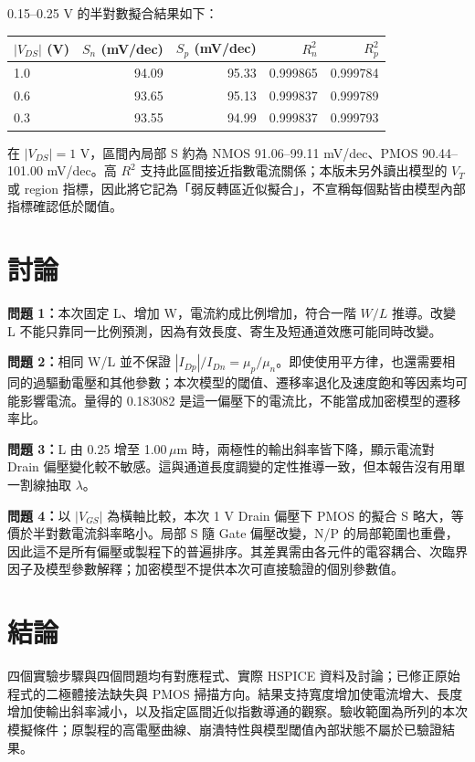 0.15--0.25 V 的半對數擬合結果如下：
\begin{center}
\setlength{\tabcolsep}{3pt}
\begin{tabular}{lrrrr}
\toprule
$|V_{DS}|$ (V) & $S_n$ (mV/dec) & $S_p$ (mV/dec) & $R_n^2$ & $R_p^2$ \\
\midrule
1.0 & 94.09 & 95.33 & 0.999865 & 0.999784 \\
0.6 & 93.65 & 95.13 & 0.999837 & 0.999789 \\
0.3 & 93.55 & 94.99 & 0.999837 & 0.999793 \\
\bottomrule
\end{tabular}
\end{center}

在 $|V_{DS}|=1$ V，區間內局部 S 約為 NMOS 91.06--99.11 mV/dec、PMOS 90.44--101.00 mV/dec。高 $R^2$ 支持此區間接近指數電流關係；本版未另外讀出模型的 $V_T$ 或 region 指標，因此將它記為「弱反轉區近似擬合」，不宣稱每個點皆由模型內部指標確認低於閾值。

\section{討論}
\textbf{問題 1：}本次固定 L、增加 W，電流約成比例增加，符合一階 $W/L$ 推導。改變 L 不能只靠同一比例預測，因為有效長度、寄生及短通道效應可能同時改變。

\textbf{問題 2：}相同 W/L 並不保證 $|I_{Dp}|/I_{Dn}=\mu_p/\mu_n$。即使使用平方律，也還需要相同的過驅動電壓和其他參數；本次模型的閾值、遷移率退化及速度飽和等因素均可能影響電流。量得的 0.183082 是這一偏壓下的電流比，不能當成加密模型的遷移率比。

\textbf{問題 3：}L 由 0.25 增至 1.00\,$\mu$m 時，兩極性的輸出斜率皆下降，顯示電流對 Drain 偏壓變化較不敏感。這與通道長度調變的定性推導一致，但本報告沒有用單一割線抽取 $\lambda$。

\textbf{問題 4：}以 $|V_{GS}|$ 為橫軸比較，本次 1 V Drain 偏壓下 PMOS 的擬合 S 略大，等價於半對數電流斜率略小。局部 S 隨 Gate 偏壓改變，N/P 的局部範圍也重疊，因此這不是所有偏壓或製程下的普遍排序。其差異需由各元件的電容耦合、次臨界因子及模型參數解釋；加密模型不提供本次可直接驗證的個別參數值。

\section{結論}
四個實驗步驟與四個問題均有對應程式、實際 HSPICE 資料及討論；已修正原始程式的二極體接法缺失與 PMOS 掃描方向。結果支持寬度增加使電流增大、長度增加使輸出斜率減小，以及指定區間近似指數導通的觀察。驗收範圍為所列的本次模擬條件；原製程的高電壓曲線、崩潰特性與模型閾值內部狀態不屬於已驗證結果。
